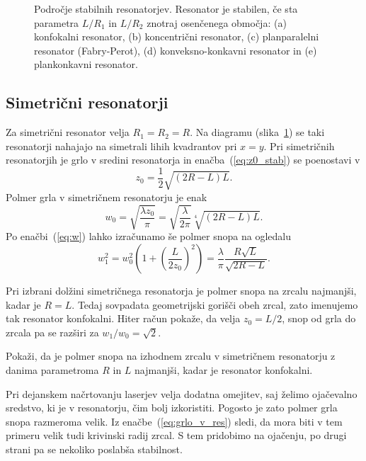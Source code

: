 \begin{figure}[h]
\centering
\def\svgwidth{100truemm} 

\caption{Področje stabilnih resonatorjev. Resonator je stabilen, 
če sta parametra $L/R_{1}$ in $L/R_{2}$ znotraj osenčenega območja: 
(a) konfokalni resonator,
(b) koncentrični resonator, 
(c) planparalelni resonator (Fabry-Perot), 
(d) konveksno-konkavni resonator 
in (e) plankonkavni resonator.}
\label{fig:Podrocje-stabilnih-resonatorjev}
\end{figure}

\subsection*{Simetrični resonatorji}
Za simetrični resonator velja $R_{1}=R_{2}=R$. Na diagramu 
(slika~\ref{fig:Podrocje-stabilnih-resonatorjev}) 
se taki resonatorji nahajajo na simetrali lihih kvadrantov pri $x=y$. Pri simetričnih resonatorjih 
je grlo v sredini resonatorja in enačba~(\ref{eq:z0_stab}) se poenostavi v 
\begin{equation}
z_{0}=\frac{1}{2}\sqrt{(2R-L)L}.
\label{eq:zosim}
\end{equation}
Polmer grla v simetričnem resonatorju je enak
\begin{equation}
w_{0}=\sqrt{\frac{\lambda z_{0}}{\pi}}=\sqrt{\frac{\lambda}{2\pi}}\sqrt[4]{(2R-L)L}.
\label{eq:grlo_v_res}
\end{equation}
Po enačbi~(\ref{eq:w}) lahko izračunamo še polmer snopa na ogledalu
\begin{equation}
w_{1}^{2}=w_{0}^{2}\left(1+\left(\frac{L}{2z_{0}}\right)^{2}\right)=
\frac{\lambda}{\pi}\frac{R\sqrt{L}}{\sqrt{2R-L}}.
\end{equation}

Pri izbrani dolžini simetričnega resonatorja je polmer snopa na zrcalu najmanjši,
kadar je $R=L$. Tedaj sovpadata geometrijski gorišči obeh zrcal,
zato imenujemo tak resonator konfokalni. 
Hiter račun pokaže, da velja $z_{0}=L/2$, snop od grla do zrcala pa se razširi
za $w_1/w_0=\sqrt{2}$. 
\begin{definition}
\label{naloga:uklon_konf}
 Pokaži, da je polmer snopa na izhodnem zrcalu v simetričnem resonatorju z
 danima parametroma $R$ in $L$ najmanjši, kadar je resonator konfokalni.
\end{definition}

Pri dejanskem načrtovanju laserjev velja dodatna omejitev, saj želimo 
ojačevalno sredstvo, ki je v resonatorju, čim bolj izkoristiti. Pogosto je zato 
polmer grla snopa razmeroma velik. Iz enačbe~(\ref{eq:grlo_v_res})
sledi, da mora biti v tem primeru velik tudi krivinski radij zrcal. S tem
pridobimo na ojačenju, po drugi strani pa se nekoliko poslabša stabilnost.


